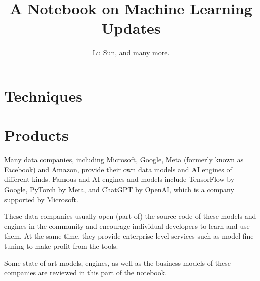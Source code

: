 



\makeindex



\frontmatter

\title{A Notebook on Machine Learning Updates}
\author{Lu Sun, and many more.}

\maketitle


\tableofcontents


\listoffigures
\listoftables

\mainmatter

\part{Techniques}



\part{Products}

Many data companies, including Microsoft, Google, Meta (formerly known as Facebook) and Amazon, provide their own data models and AI engines of different kinds. Famous and AI engines and models include TensorFlow by Google, PyTorch by Meta, and ChatGPT by OpenAI, which is a company supported by Microsoft.

These data companies usually open (part of) the source code of these models and engines in the community and encourage individual developers to learn and use them. At the same time, they provide enterprise level services such as model fine-tuning to make profit from the tools.

Some state-of-art models, engines, as well as the business models of these companies are reviewed in this part of the notebook.








\printindex


